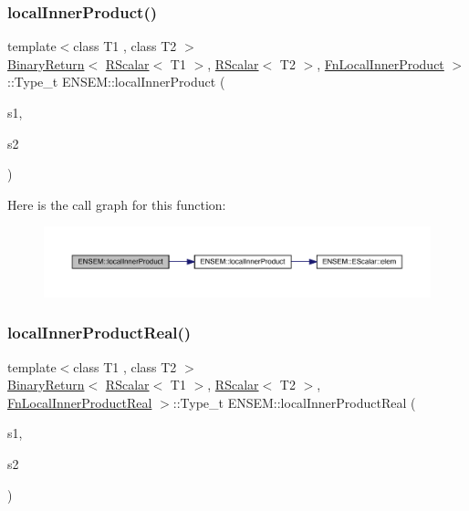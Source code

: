 \subsubsection{\texorpdfstring{localInnerProduct()}{localInnerProduct()}}
{\footnotesize\ttfamily template$<$class T1 , class T2 $>$ \\
\mbox{\hyperlink{structENSEM_1_1BinaryReturn}{Binary\+Return}}$<$ \mbox{\hyperlink{classENSEM_1_1RScalar}{R\+Scalar}}$<$ T1 $>$, \mbox{\hyperlink{classENSEM_1_1RScalar}{R\+Scalar}}$<$ T2 $>$, \mbox{\hyperlink{structENSEM_1_1FnLocalInnerProduct}{Fn\+Local\+Inner\+Product}} $>$\+::Type\+\_\+t E\+N\+S\+E\+M\+::local\+Inner\+Product (\begin{DoxyParamCaption}\item[{const \mbox{\hyperlink{classENSEM_1_1RScalar}{R\+Scalar}}$<$ T1 $>$ \&}]{s1,  }\item[{const \mbox{\hyperlink{classENSEM_1_1RScalar}{R\+Scalar}}$<$ T2 $>$ \&}]{s2 }\end{DoxyParamCaption})\hspace{0.3cm}{\ttfamily [inline]}}

Here is the call graph for this function\+:\nopagebreak
\begin{figure}[H]
\begin{center}
\leavevmode
\includegraphics[width=350pt]{d9/ded/group__rscalar_gadd76bb3801e8a4665498325bf9c7f6ae_cgraph}
\end{center}
\end{figure}
\mbox{\label{group__rscalar_gafd6d5a4377919b182f234ffe0eea09b4}} 
\subsubsection{\texorpdfstring{localInnerProductReal()}{localInnerProductReal()}}
{\footnotesize\ttfamily template$<$class T1 , class T2 $>$ \\
\mbox{\hyperlink{structENSEM_1_1BinaryReturn}{Binary\+Return}}$<$ \mbox{\hyperlink{classENSEM_1_1RScalar}{R\+Scalar}}$<$ T1 $>$, \mbox{\hyperlink{classENSEM_1_1RScalar}{R\+Scalar}}$<$ T2 $>$, \mbox{\hyperlink{structENSEM_1_1FnLocalInnerProductReal}{Fn\+Local\+Inner\+Product\+Real}} $>$\+::Type\+\_\+t E\+N\+S\+E\+M\+::local\+Inner\+Product\+Real (\begin{DoxyParamCaption}\item[{const \mbox{\hyperlink{classENSEM_1_1RScalar}{R\+Scalar}}$<$ T1 $>$ \&}]{s1,  }\item[{const \mbox{\hyperlink{classENSEM_1_1RScalar}{R\+Scalar}}$<$ T2 $>$ \&}]{s2 }\end{DoxyParamCaption})\hspace{0.3cm}{\ttfamily [inline]}}

